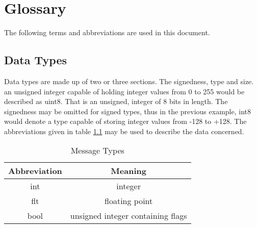 \chapter{Glossary}
The following terms and abbreviations are used in this document.

\section{Data Types}
Data types are made up of two or three sections. The signedness, type and size. an unsigned integer capable of holding integer values from 0 to 255 would be described as uint8. That is an unsigned, integer of 8 bits in length. The signedness may be omitted for signed types, thus in the previous example, int8 would denote a type capable of storing integer values from -128 to +128. The abbreviations given in table \ref{tab:typeabbrv} may be used to describe the data concerned.

\begin{table}[H]
  \centering
  \begin{tabular}{ c c }
  Abbreviation & Meaning \\
\hline
  int  & integer \\
  flt  & floating point \\
  bool & unsigned integer containing flags \\ 
  \end{tabular}
  \caption{Message Types}
  \label{tab:typeabbrv}
\end{table}